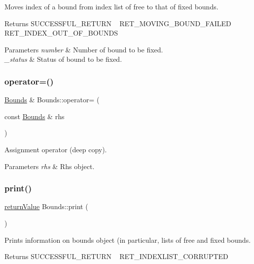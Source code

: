 Moves index of a bound from index list of free to that of fixed bounds. \begin{DoxyReturn}{Returns}
S\+U\+C\+C\+E\+S\+S\+F\+U\+L\+\_\+\+R\+E\+T\+U\+RN ~\newline
 R\+E\+T\+\_\+\+M\+O\+V\+I\+N\+G\+\_\+\+B\+O\+U\+N\+D\+\_\+\+F\+A\+I\+L\+ED ~\newline
 R\+E\+T\+\_\+\+I\+N\+D\+E\+X\+\_\+\+O\+U\+T\+\_\+\+O\+F\+\_\+\+B\+O\+U\+N\+DS 
\end{DoxyReturn}

\begin{DoxyParams}{Parameters}
{\em number} & Number of bound to be fixed. \\
\hline
{\em \+\_\+status} & Status of bound to be fixed. \\
\hline
\end{DoxyParams}
\mbox{\label{class_bounds_a394c33cd33ba7c8560121f414bececdb}} 
\subsubsection{\texorpdfstring{operator=()}{operator=()}}
{\footnotesize\ttfamily \hyperlink{class_bounds}{Bounds} \& Bounds\+::operator= (\begin{DoxyParamCaption}\item[{const \hyperlink{class_bounds}{Bounds} \&}]{rhs }\end{DoxyParamCaption})}

Assignment operator (deep copy). 
\begin{DoxyParams}{Parameters}
{\em rhs} & Rhs object. \\
\hline
\end{DoxyParams}
\mbox{\label{class_bounds_a04ad16d13952adff7be66e8a82ab8281}} 
\subsubsection{\texorpdfstring{print()}{print()}}
{\footnotesize\ttfamily \hyperlink{_message_handling_8hpp_a81d556f613bfbabd0b1f9488c0fa865e}{return\+Value} Bounds\+::print (\begin{DoxyParamCaption}{ }\end{DoxyParamCaption})}

Prints information on bounds object (in particular, lists of free and fixed bounds. \begin{DoxyReturn}{Returns}
S\+U\+C\+C\+E\+S\+S\+F\+U\+L\+\_\+\+R\+E\+T\+U\+RN ~\newline
 R\+E\+T\+\_\+\+I\+N\+D\+E\+X\+L\+I\+S\+T\+\_\+\+C\+O\+R\+R\+U\+P\+T\+ED 
\end{DoxyReturn}
\mbox{\label{class_bounds_abe45f347747df4a323d1d55bc21a5914}} 
